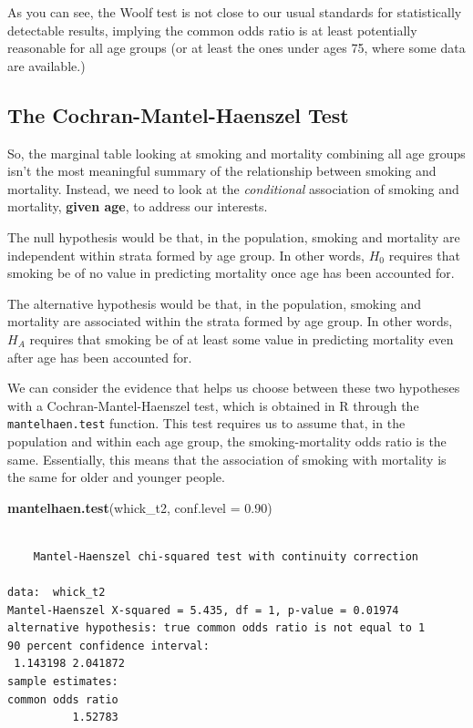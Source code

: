 \documentclass[
]{book}
\newenvironment{Shaded}{\begin{snugshade}}{\end{snugshade}}
\newcommand{\DataTypeTok}[1]{\textcolor[rgb]{0.13,0.29,0.53}{#1}}
\newcommand{\FloatTok}[1]{\textcolor[rgb]{0.00,0.00,0.81}{#1}}
\newcommand{\KeywordTok}[1]{\textcolor[rgb]{0.13,0.29,0.53}{\textbf{#1}}}
\newcommand{\NormalTok}[1]{#1}
\begin{document}
As you can see, the Woolf test is not close to our usual standards for statistically detectable results, implying the common odds ratio is at least potentially reasonable for all age groups (or at least the ones under ages 75, where some data are available.)

\hypertarget{the-cochran-mantel-haenszel-test}{%
\subsection{The Cochran-Mantel-Haenszel Test}\label{the-cochran-mantel-haenszel-test}}

So, the marginal table looking at smoking and mortality combining all age groups isn't the most meaningful summary of the relationship between smoking and mortality. Instead, we need to look at the \emph{conditional} association of smoking and mortality, \textbf{given age}, to address our interests.

The null hypothesis would be that, in the population, smoking and mortality are independent within strata formed by age group. In other words, \(H_0\) requires that smoking be of no value in predicting mortality once age has been accounted for.

The alternative hypothesis would be that, in the population, smoking and mortality are associated within the strata formed by age group. In other words, \(H_A\) requires that smoking be of at least some value in predicting mortality even after age has been accounted for.

We can consider the evidence that helps us choose between these two hypotheses with a Cochran-Mantel-Haenszel test, which is obtained in R through the \texttt{mantelhaen.test} function. This test requires us to assume that, in the population and within each age group, the smoking-mortality odds ratio is the same. Essentially, this means that the association of smoking with mortality is the same for older and younger people.

\begin{Shaded}
\begin{Highlighting}[]
\KeywordTok{mantelhaen.test}\NormalTok{(whick_t2, }\DataTypeTok{conf.level  =} \FloatTok{0.90}\NormalTok{)}
\end{Highlighting}
\end{Shaded}

\begin{verbatim}

	Mantel-Haenszel chi-squared test with continuity correction

data:  whick_t2
Mantel-Haenszel X-squared = 5.435, df = 1, p-value = 0.01974
alternative hypothesis: true common odds ratio is not equal to 1
90 percent confidence interval:
 1.143198 2.041872
sample estimates:
common odds ratio 
          1.52783 
\end{verbatim}
\end{document}

